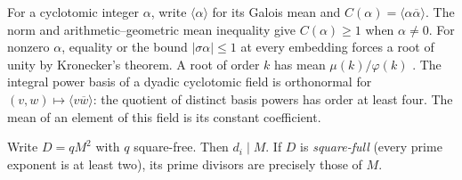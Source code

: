 \documentclass[11pt]{amsart}
\numberwithin{equation}{section}
\theoremstyle{definition}
\theoremstyle{plain}
\begin{document}
For a cyclotomic integer $\alpha$, write $\langle\alpha\rangle$ for
its Galois mean and $C(\alpha)=\langle\alpha\overline\alpha\rangle$.
The norm and arithmetic--geometric mean inequality give $C(\alpha)\ge1$
when $\alpha\ne0$. For nonzero $\alpha$, equality or the bound $|\sigma\alpha|\le1$ at
every embedding forces a root of unity by Kronecker's theorem.
A root of order $k$ has mean $\mu(k)/\varphi(k)$
\cite[Theorem~8.6]{Apostol}. The integral power basis of a dyadic
cyclotomic field is orthonormal for $(v,w)\mapsto\langle v\overline w\rangle$:
the quotient of distinct basis powers has order at least four.
The mean of an element of this field is its constant coefficient.

Write $D=qM^2$ with $q$ square-free. Then $d_i\mid M$. If $D$ is
\emph{square-full} (every prime exponent is at least two), its prime
divisors are precisely those of $M$.
\end{document}
